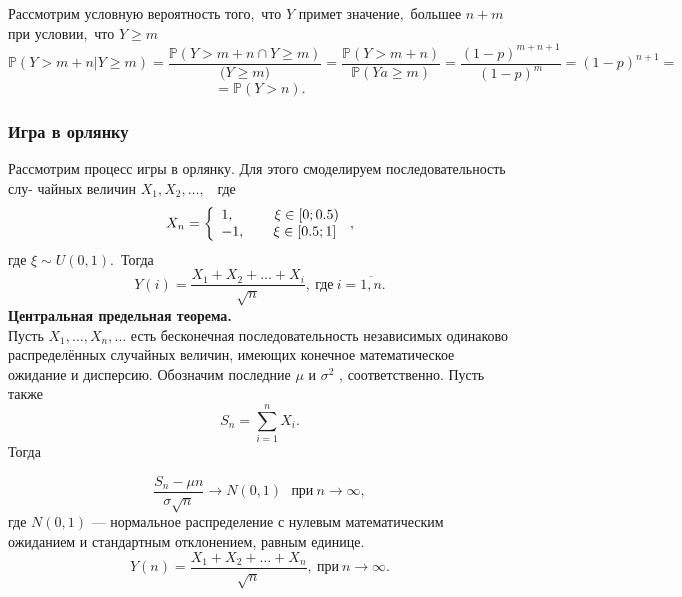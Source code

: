 \documentclass[11pt]{article}
\begin{document}
    	Рассмотрим условную вероятность того,\ что {$Y$} примет значение,\ большее {$n + m$} при условии,\ что {$Y \geqslant m$} 
    	$$\mathbb P(Y > m + n|Y\geqslant m) = \frac{\mathbb P(Y > m + n\cap Y\geqslant m)}{\mathbb(Y\geqslant m)} = \frac{\mathbb P(Y > m + n)}{\mathbb P(Ya \geqslant m)} = \frac{(1-p)^{m+n+1}}{(1-p)^m} = (1-p)^{n+1}= 
    	$$
    	$$= \mathbb P(Y > n).$$
  
	
	\subsubsection{Игра в орлянку }
	Рассмотрим процесс игры в орлянку. Для этого смоделируем последовательность слу-
	чайных величин {$X_1,X_2,\dots,$}~ где
	$$
	X_n = \left\{ 
	\begin{array}{lcr}
	1, \hspace{1cm}\xi\in[0;0.5)\\
	-1, \hspace{7 mm}\xi\in[0.5;1]
	\end{array}
	\right.
	,$$
	где {$\xi\sim U(0,1)$}.\ Тогда 
	$$Y(i) = \frac{X_1 + X_2 + \dots + X_i}{\sqrt{n}},~ \text{где} ~i = \overline{1,n}.$$
	\textbf{Центральная предельная теорема.}\\ 
	\indent Пусть {$ X_{1},\ldots ,X_{n},\ldots $}  есть бесконечная последовательность независимых одинаково распределённых случайных величин, имеющих конечное математическое ожидание и дисперсию. Обозначим последние {$ \mu$ }  и {$ \sigma ^{2}$} , соответственно. Пусть также 
	$$S_n = \sum_{i = 1}^n X_i.$$
	Тогда
	
	$$ {\dfrac {S_{n}-\mu n}{\sigma {\sqrt {n}}}}\to N(0,1)~ ~ ~\text{при}~ n\to \infty,$$  
	где {$ N(0,1)$}  — нормальное распределение с нулевым математическим ожиданием и стандартным отклонением, равным единице.\\
	$$Y(n) = \frac{X_1 + X_2 + \dots + X_n}{\sqrt{n}},~ \text{при}~ n\to \infty.$$
	
\end{document}
